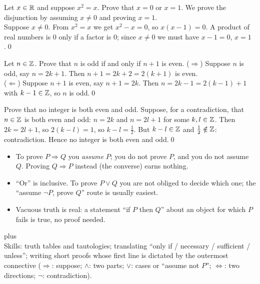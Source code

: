 \begin{hexample}
Let $x\in\mathbb{R}$ and suppose $x^2=x$. Prove that $x=0$ or $x=1$.
\solution
We prove the disjunction by assuming $x\neq0$ and proving $x=1$.\\
Suppose $x\neq0$. From $x^2=x$ we get $x^2-x=0$, so $x(x-1)=0$. A product of real numbers is $0$ only if a factor is $0$; since $x\neq0$ we must have $x-1=0$, \ie $x=1$.\qed
\end{hexample}

\begin{hexample}[biconditional]
Let $n\in\mathbb{Z}$. Prove that $n$ is odd if and only if $n+1$ is even.
\solution
($\Rightarrow$) Suppose $n$ is odd, say $n=2k+1$. Then $n+1=2k+2=2(k+1)$ is even.\\
($\Leftarrow$) Suppose $n+1$ is even, say $n+1=2k$. Then $n=2k-1=2(k-1)+1$ with $k-1\in\mathbb{Z}$, so $n$ is odd.\qed
\end{hexample}

\begin{hexample}
Prove that no integer is both even and odd.
\solution
Suppose, for a contradiction, that $n\in\mathbb{Z}$ is both even and odd: $n=2k$ and $n=2l+1$ for some $k,l\in\mathbb{Z}$. Then $2k=2l+1$, so $2(k-l)=1$, so $k-l=\tfrac12$. But $k-l\in\mathbb{Z}$ and $\tfrac12\notin\mathbb{Z}$: contradiction. Hence no integer is both even and odd.\qed
\end{hexample}

\begin{warn}
\begin{itemize}
\item To prove $P\Rightarrow Q$ you \emph{assume} $P$; you do not prove $P$, and you do not assume $Q$. Proving $Q\Rightarrow P$ instead (the converse) earns nothing.
\item ``Or'' is inclusive. To prove $P\vee Q$ you are not obliged to decide which one; the ``assume $\neg P$, prove $Q$'' route is usually easiest.
\item Vacuous truth is real: a statement ``if $P$ then $Q$'' about an object for which $P$ fails is true, no proof needed.
\end{itemize}
\end{warn}

\begin{planning}[1.1]
\quad {}\quad plus \\[3pt]
Skills: truth tables and tautologies; translating ``only if / necessary / sufficient / unless''; writing short proofs whose first line is dictated by the outermost connective ($\Rightarrow$: suppose; $\wedge$: two parts; $\vee$: cases or ``assume not $P$''; $\Leftrightarrow$: two directions; $\neg$: contradiction).
\end{planning}

